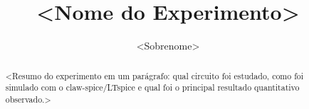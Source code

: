 \documentclass[tcc,capa,oneside]{texufpel}
\title{<Nome do Experimento>}
\author{<Sobrenome>}{<Nome do Autor>}
\begin{document}
\renewcommand{\advisorname}{Professor}

\maketitle

\sloppy

\begin{abstract}
<Resumo do experimento em um parágrafo: qual circuito foi estudado, como
foi simulado com o claw-spice/LTspice e qual foi o principal resultado
quantitativo observado.>
\end{abstract}

\listoffigures

\listoftables

\tableofcontents









\apendices

\end{document}
